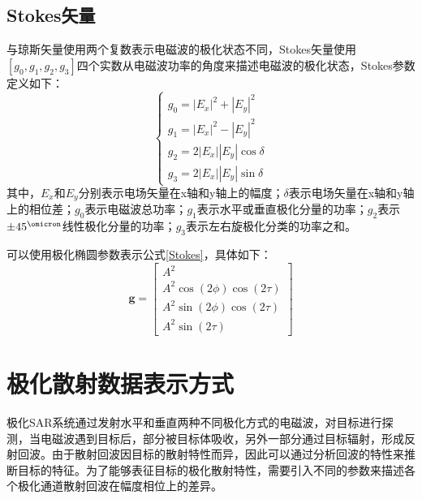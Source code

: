 \subsection{Stokes矢量}
与琼斯矢量使用两个复数表示电磁波的极化状态不同，Stokes矢量使用$[g_0,g_1,g_2,g_3]$四个实数从电磁波功率的角度来描述电磁波的极化状态，Stokes参数定义如下：
\begin{equation}
  \label{Stokes}
  \left\{\begin{array}{l}
    g_0=\left|E_x\right|^2+\left|E_y\right|^2         \\
    g_1=\left|E_x\right|^2-\left|E_y\right|^2         \\
    g_2=2\left|E_x\right|\left|E_y\right| \cos \delta \\
    g_3=2\left|E_x\right|\left|E_y\right| \sin \delta
  \end{array}\right.
\end{equation}
其中，$E_x$和$E_y$分别表示电场矢量在x轴和y轴上的幅度；$\delta$表示电场矢量在x轴和y轴上的相位差；$g_0$表示电磁波总功率；$g_1$表示水平或垂直极化分量的功率；$g_2$表示$\pm 45^{\operatorname{\omicron}}$线性极化分量的功率；$g_3$表示左右旋极化分类的功率之和。

可以使用极化椭圆参数表示公式\eqref{Stokes}，具体如下：
\begin{equation}
  \boldsymbol{g}=\left[\begin{array}{c}
      A^2                             \\
      A^2 \cos (2 \phi) \cos (2 \tau) \\
      A^2 \sin (2 \phi) \cos (2 \tau) \\
      A^2 \sin (2 \tau)
    \end{array}\right]
\end{equation}

\section{极化散射数据表示方式}
极化SAR系统通过发射水平和垂直两种不同极化方式的电磁波，对目标进行探测，当电磁波遇到目标后，部分被目标体吸收，另外一部分通过目标辐射，形成反射回波。由于散射回波因目标的散射特性而异，因此可以通过分析回波的特性来推断目标的特征。为了能够表征目标的极化散射特性，需要引入不同的参数来描述各个极化通道散射回波在幅度相位上的差异。
